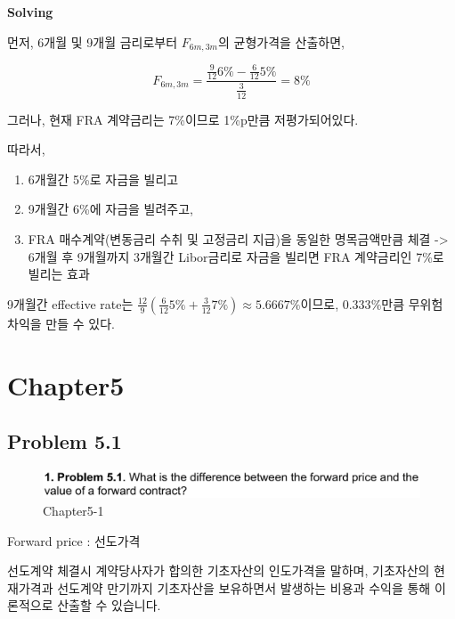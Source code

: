 \documentclass[
  letterpaper,
  DIV=11,
  numbers=noendperiod]{scrreprt}
\providecommand{\tightlist}{%
  \setlength{\itemsep}{0pt}\setlength{\parskip}{0pt}}\usepackage{longtable,booktabs,array}
\begin{document}
\textbf{Solving}

먼저, 6개월 및 9개월 금리로부터 \(F_{6m,3m}\)의 균형가격을 산출하면,

\[F_{6m,3m}=\frac{\frac{9}{12}6\%-\frac{6}{12}5\%}{\frac{3}{12}}=8\%\]

그러나, 현재 FRA 계약금리는 7\%이므로 1\%p만큼 저평가되어있다.

따라서,

\begin{enumerate}
\def\labelenumi{\arabic{enumi}.}
\tightlist
\item
  6개월간 5\%로 자금을 빌리고
\item
  9개월간 6\%에 자금을 빌려주고,
\item
  FRA 매수계약(변동금리 수취 및 고정금리 지급)을 동일한 명목금액만큼
  체결 -\textgreater{} 6개월 후 9개월까지 3개월간 Libor금리로 자금을
  빌리면 FRA 계약금리인 7\%로 빌리는 효과
\end{enumerate}

9개월간 effective rate는
\(\frac{12}{9}(\frac{6}{12}5\%+\frac{3}{12}7\%)\approx 5.6667\%\)이므로,
\(0.333\%\)만큼 무위험 차익을 만들 수 있다.

\section*{Chapter5}\label{chapter5}


\subsection*{\texorpdfstring{\textbf{Problem
5.1}}{Problem 5.1}}\label{problem-5.1}

\begin{figure}[H]

{\centering \includegraphics{images/선물옵션_5-1.png}

}

\caption{Chapter5-1}

\end{figure}%

Forward price : 선도가격

선도계약 체결시 계약당사자가 합의한 기초자산의 인도가격을 말하며,
기초자산의 현재가격과 선도계약 만기까지 기초자산을 보유하면서 발생하는
비용과 수익을 통해 이론적으로 산출할 수 있습니다.
\end{document}
